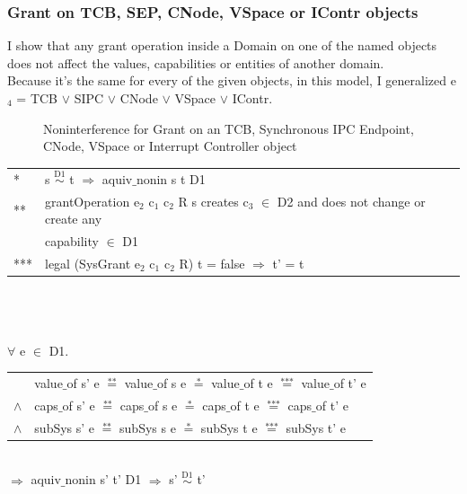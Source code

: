 \documentclass[pdftex,11pt,a4paper,twoside]{article}
\begin{document}
\subsubsection{Grant on TCB, SEP, CNode, VSpace or IContr objects} 
I show that any grant operation inside a Domain on one of the named objects does not affect the values, capabilities or entities of another domain. \\
Because it's the same for every of the given objects, in this model, I generalized e$_4$ = TCB $\vee$ SIPC $\vee$ CNode $\vee$ VSpace $\vee$ IContr.
\begin{flushleft}
\begin{figure}[H]
\caption{Noninterference for Grant on an TCB, Synchronous IPC Endpoint, CNode, VSpace or Interrupt Controller object}
\end{figure}
\end{flushleft}
\begin{tabular}{ll}
* & s $\overset{\text{D1}}{\sim}$ t $\Rightarrow$ aquiv$\_$nonin s t D1	\\ 
** & grantOperation e$_2$ c$_1$ c$_2$ R s creates c$_3$ $\in$ D2 and does not change or create any \\
& capability $\in$ D1 \\ 
*** & legal (SysGrant e$_2$ c$_1$ c$_2$ R) t = false $\Rightarrow$ t' = t
\end{tabular}\\ \\ \\
$\forall$ e $\in$ D1. \\ 
\begin{tabular}{ll}
& value$\_$of s' e $\overset{\text{**}}{=}$ value$\_$of s e $\overset{\text{*}}{=}$ value$\_$of t e $\overset{\text{***}}{=}$ value$\_$of t' e \\
$\wedge$ & caps$\_$of s' e $\overset{\text{**}}{=}$ caps$\_$of s e $\overset{\text{*}}{=}$ caps$\_$of t e $\overset{\text{***}}{=}$ caps$\_$of t' e \\
$\wedge$ & subSys s' e $\overset{\text{**}}{=}$ subSys s e $\overset{\text{*}}{=}$ subSys t e $\overset{\text{***}}{=}$ subSys t' e
\end{tabular} \\
$\Rightarrow$ aquiv$\_$nonin s' t' D1 $\Rightarrow$ s' $\overset{\text{D1}}{\sim}$ t'
\end{document}
